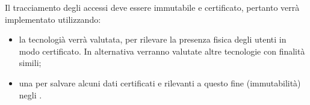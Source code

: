 Il tracciamento degli accessi deve essere immutabile e certificato, pertanto verrà implementato utilizzando:
\begin{itemize}
    \item la tecnologià  verrà valutata, per rilevare la presenza fisica degli utenti in modo certificato. In alternativa verranno valutate altre tecnologie con finalità simili;
    \item una  per salvare alcuni dati certificati e rilevanti a questo fine (immutabilità) negli .
\end{itemize}